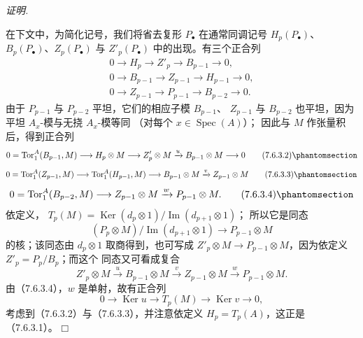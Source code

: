\documentclass[UTF8,fontset=none,11pt,oneside,openany]{ctexbook}
\providecommand{\square}{\mdlgwhtsquare}
\newenvironment{proof}{%
  \par\smallskip\noindent\textit{证明.}\ %
}{\hfill$\square$\par}
\let\EGAOriginalLabel\label
\renewcommand{\label}[1]{\phantomsection\EGAOriginalLabel{#1}}
\begin{document}
\begin{proof}
在下文中，为简化记号，我们将省去复形 $P_\bullet$ 在通常同调记号
$H_p(P_\bullet)$、$B_p(P_\bullet)$、$Z_p(P_\bullet)$ 与
$Z'_p(P_\bullet)$ 中的出现。有三个正合列
\begin{gather*}
  0\longrightarrow H_p\longrightarrow Z'_p\longrightarrow B_{p-1}
  \longrightarrow0,\\
  0\longrightarrow B_{p-1}\longrightarrow Z_{p-1}\longrightarrow H_{p-1}
  \longrightarrow0,\\
  0\longrightarrow Z_{p-1}\longrightarrow P_{p-1}\longrightarrow B_{p-2}
  \longrightarrow0.
\end{gather*}
由于 $P_{p-1}$ 与 $P_{p-2}$ 平坦，它们的相应子模 $B_{p-1}$、
$Z_{p-1}$ 与 $B_{p-2}$ 也平坦，因为平坦 $A_x$-模与无挠 $A_x$-模等同
（对每个 $x\in\operatorname{Spec}(A)$）；
因此与 $M$ 作张量积后，得到正合列
\[
  0=\operatorname{Tor}_1^A(B_{p-1},M)
  \longrightarrow H_p\otimes M
  \longrightarrow Z'_p\otimes M
  \xrightarrow{u}B_{p-1}\otimes M
  \longrightarrow0
  \tag{7.6.3.2}\label{III.7.6.3.2.fr}
\]
\[
  0=\operatorname{Tor}_1^A(Z_{p-1},M)
  \longrightarrow\operatorname{Tor}_1^A(H_{p-1},M)
  \longrightarrow B_{p-1}\otimes M
  \xrightarrow{v}Z_{p-1}\otimes M
  \tag{7.6.3.3}\label{III.7.6.3.3.fr}
\]
\[
  0=\operatorname{Tor}_1^A(B_{p-2},M)
  \longrightarrow Z_{p-1}\otimes M
  \xrightarrow{w}P_{p-1}\otimes M.
  \tag{7.6.3.4}\label{III.7.6.3.4.fr}
\]
依定义，
$T_p(M)=\operatorname{Ker}(d_p\otimes1)/\operatorname{Im}(d_{p+1}\otimes1)$；
所以它是同态
\[
  (P_p\otimes M)/\operatorname{Im}(d_{p+1}\otimes1)
  \longrightarrow P_{p-1}\otimes M
\]
的核；该同态由 $d_p\otimes1$ 取商得到，也可写成
$Z'_p\otimes M\to P_{p-1}\otimes M$，因为依定义 $Z'_p=P_p/B_p$；而这个
同态又可看成复合
\[
  Z'_p\otimes M
  \xrightarrow{u}B_{p-1}\otimes M
  \xrightarrow{v}Z_{p-1}\otimes M
  \xrightarrow{w}P_{p-1}\otimes M.
\]
由（7.6.3.4），$w$ 是单射，故有正合列
\[
  0\longrightarrow\operatorname{Ker}u
  \longrightarrow T_p(M)
  \longrightarrow\operatorname{Ker}v
  \longrightarrow0,
\]
考虑到（7.6.3.2）与（7.6.3.3），并注意依定义 $H_p=T_p(A)$，这正是
（7.6.3.1）。
\end{proof}
\end{document}
